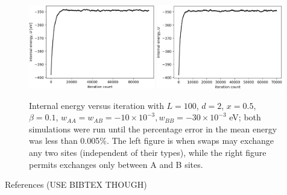 \documentclass[10pt]{article}
\begin{document}
\begin{figure}[h]
\centering
\includegraphics[width=0.49\textwidth]{Figures/swap_any_two_convergence.png}
\includegraphics[width=0.49\textwidth]{Figures/swap_A_B_only_convergence.png}
\caption{Internal energy versus iteration with $L=100$, $d=2$, $x=0.5$, $\beta=0.1$, $w_{AA}=w_{AB}=-10 \times 10^{-3},w_{BB} = -30 \times 10^{-3}$ eV; both simulations were run until the percentage error in the mean energy was less than 0.005\%.
The left figure is when swaps may exchange any two sites (independent of their types), while the right figure permits exchanges only between A and B sites.}
\label{fig:swap}
\end{figure}


\newpage

References (USE BIBTEX THOUGH)
\end{document}
